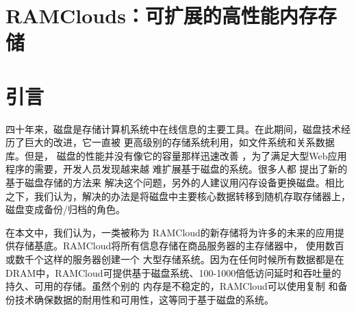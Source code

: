 \documentclass[translation]{zjutreport}
\begin{document}


\frontmatter %

\begingroup %
\let\clearpage\relax %



\titleformat{\chapter}[block]{\sihao\heiti\filcenter\bfseries}{\CJKnumber{\thechapter}}{1ex}{}{} %
\chapter*{RAMClouds：可扩展的高性能内存存储}
{} %





\mainmatter%
\chapter{引言}
四十年来，磁盘是存储计算机系统中在线信息的主要工具。在此期间，磁盘技术经历了巨大的改进，它一直被
更高级别的存储系统利用，如文件系统和关系数据库。但是，
磁盘的性能并没有像它的容量那样迅速改善
，为了满足大型Web应用程序的需要，开发人员发现越来越
难扩展基于磁盘的系统。很多人都
提出了新的基于磁盘存储的方法来
解决这个问题，另外的人建议用​​闪存设备更换磁盘。相比之下，我们认为，解决的办法是将磁盘中主要核心数据转移到随机存取存储器上，
磁盘变成备份/归档的角色。

在本文中，我们认为，一类被称为
RAMCloud的新存储将为许多的未来的应用提供存储基底。RAMCloud将所有信息存储在商品服务器的主存储器中，
使用数百或数千个这样的服务器创建一个
大型存储系统。因为在任何时候所有数据都是在
DRAM中，RAMCloud可提供基于磁盘系统、100-1000倍低访问延时和吞吐量的持久、可用的存储。虽然个别的
内存是不稳定的，RAMCloud可以使用复制
和备份技术确保数据的耐用性和可用性，这等同于基于磁盘的系统。
\end{document}
